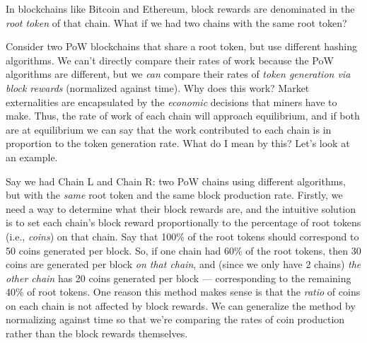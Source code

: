 In blockchains like Bitcoin and Ethereum, block rewards are denominated
in the \emph{root token} of that chain. What if we had two chains with
the same root token?

Consider two PoW blockchains that share a root token, but use different
hashing algorithms. We can't directly compare their rates of work
because the PoW algorithms are different, but we \emph{can} compare
their rates of \emph{token generation via block rewards} (normalized
against time). Why does this work? Market externalities are encapsulated
by the \emph{economic} decisions that miners have to make. Thus, the
rate of work of each chain will approach equilibrium, and if both are at
equilibrium we can say that the work contributed to each chain is in
proportion to the token generation rate. What do I mean by this? Let's
look at an example.

Say we had Chain L and Chain R: two PoW chains using different
algorithms, but with the \emph{same} root token and the same block
production rate. Firstly, we need a way to determine what their block
rewards are, and the intuitive solution is to set each chain's block
reward proportionally to the percentage of root tokens (i.e.,
\emph{coins}) on that chain. Say that 100\% of the root tokens should
correspond to 50 coins generated per block. So, if one chain had 60\% of
the root tokens, then 30 coins are generated per block \emph{on that
chain}, and (since we only have 2 chains) \emph{the other chain} has 20
coins generated per block --- corresponding to the remaining 40\% of root
tokens. One reason this method makes sense is that the \emph{ratio} of
coins on each chain is not affected by block rewards. We can generalize
the method by normalizing against time so that we're comparing the rates
of coin production rather than the block rewards themselves.


